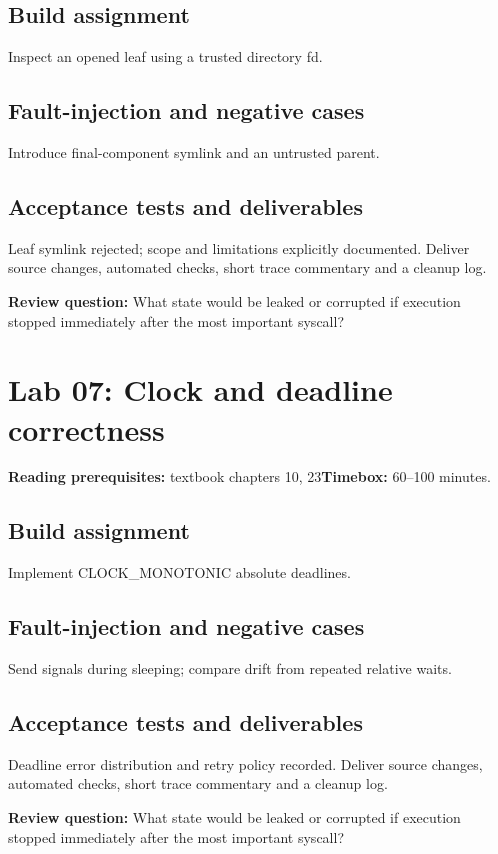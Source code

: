 \documentclass[11pt,letterpaper,oneside]{report}
\begin{document}
\subsection{Build assignment}
Inspect an opened leaf using a trusted directory fd.

\subsection{Fault-injection and negative cases}
Introduce final-component symlink and an untrusted parent.

\subsection{Acceptance tests and deliverables}
Leaf symlink rejected; scope and limitations explicitly documented. Deliver source changes, automated checks, short trace commentary and a cleanup log.

\textbf{Review question:} What state would be leaked or corrupted if execution stopped immediately after the most important syscall?

\section{Lab 07: Clock and deadline correctness}
\textbf{Reading prerequisites:} textbook chapters 10, 23\quad \textbf{Timebox:} 60--100 minutes.

\subsection{Build assignment}
Implement CLOCK\_MONOTONIC absolute deadlines.

\subsection{Fault-injection and negative cases}
Send signals during sleeping; compare drift from repeated relative waits.

\subsection{Acceptance tests and deliverables}
Deadline error distribution and retry policy recorded. Deliver source changes, automated checks, short trace commentary and a cleanup log.

\textbf{Review question:} What state would be leaked or corrupted if execution stopped immediately after the most important syscall?
\end{document}
